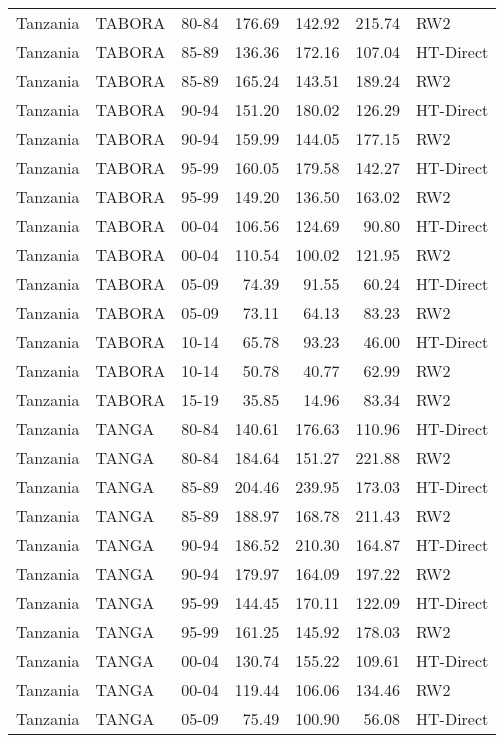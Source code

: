 \begin{longtable}{lllrrrl}
  Tanzania & TABORA & 80-84 & 176.69 & 142.92 & 215.74 & RW2 \\ 
  Tanzania & TABORA & 85-89 & 136.36 & 172.16 & 107.04 & HT-Direct \\ 
  Tanzania & TABORA & 85-89 & 165.24 & 143.51 & 189.24 & RW2 \\ 
  Tanzania & TABORA & 90-94 & 151.20 & 180.02 & 126.29 & HT-Direct \\ 
  Tanzania & TABORA & 90-94 & 159.99 & 144.05 & 177.15 & RW2 \\ 
  Tanzania & TABORA & 95-99 & 160.05 & 179.58 & 142.27 & HT-Direct \\ 
  Tanzania & TABORA & 95-99 & 149.20 & 136.50 & 163.02 & RW2 \\ 
  Tanzania & TABORA & 00-04 & 106.56 & 124.69 & 90.80 & HT-Direct \\ 
  Tanzania & TABORA & 00-04 & 110.54 & 100.02 & 121.95 & RW2 \\ 
  Tanzania & TABORA & 05-09 & 74.39 & 91.55 & 60.24 & HT-Direct \\ 
  Tanzania & TABORA & 05-09 & 73.11 & 64.13 & 83.23 & RW2 \\ 
  Tanzania & TABORA & 10-14 & 65.78 & 93.23 & 46.00 & HT-Direct \\ 
  Tanzania & TABORA & 10-14 & 50.78 & 40.77 & 62.99 & RW2 \\ 
  Tanzania & TABORA & 15-19 & 35.85 & 14.96 & 83.34 & RW2 \\ 
  Tanzania & TANGA & 80-84 & 140.61 & 176.63 & 110.96 & HT-Direct \\ 
  Tanzania & TANGA & 80-84 & 184.64 & 151.27 & 221.88 & RW2 \\ 
  Tanzania & TANGA & 85-89 & 204.46 & 239.95 & 173.03 & HT-Direct \\ 
  Tanzania & TANGA & 85-89 & 188.97 & 168.78 & 211.43 & RW2 \\ 
  Tanzania & TANGA & 90-94 & 186.52 & 210.30 & 164.87 & HT-Direct \\ 
  Tanzania & TANGA & 90-94 & 179.97 & 164.09 & 197.22 & RW2 \\ 
  Tanzania & TANGA & 95-99 & 144.45 & 170.11 & 122.09 & HT-Direct \\ 
  Tanzania & TANGA & 95-99 & 161.25 & 145.92 & 178.03 & RW2 \\ 
  Tanzania & TANGA & 00-04 & 130.74 & 155.22 & 109.61 & HT-Direct \\ 
  Tanzania & TANGA & 00-04 & 119.44 & 106.06 & 134.46 & RW2 \\ 
  Tanzania & TANGA & 05-09 & 75.49 & 100.90 & 56.08 & HT-Direct \\ 

\end{longtable}

